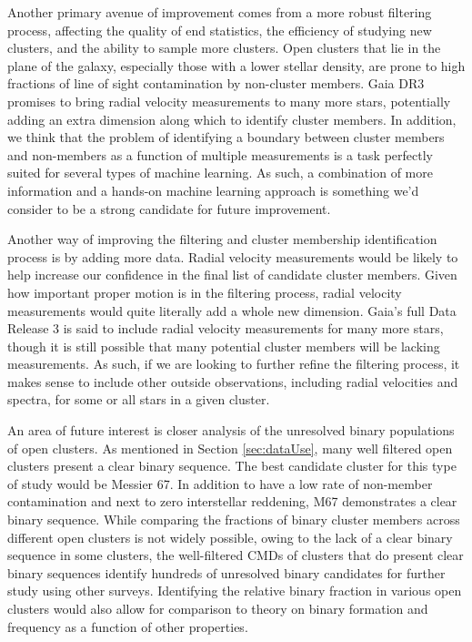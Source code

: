 \documentclass[onecolumn,table,xcdraw,super]{aastex631}
\begin{document}
Another primary avenue of improvement comes from a more robust filtering process, affecting the quality of end statistics, the efficiency of studying new clusters, and the ability to sample more clusters. Open clusters that lie in the plane of the galaxy, especially those with a lower stellar density, are prone to high fractions of line of sight contamination by non-cluster members. Gaia DR3 promises to bring radial velocity measurements to many more stars, potentially adding an extra dimension along which to identify cluster members. In addition, we think that the problem of identifying a boundary between cluster members and non-members as a function of multiple measurements is a task perfectly suited for several types of machine learning. As such, a combination of more information and a hands-on machine learning approach is something we'd consider to be a strong candidate for future improvement.

Another way of improving the filtering and cluster membership identification process is by adding more data. Radial velocity measurements would be likely to help increase our confidence in the final list of candidate cluster members. Given how important proper motion is in the filtering process, radial velocity measurements would quite literally add a whole new dimension. Gaia's full Data Release 3 is said to include radial velocity measurements for many more stars, though it is still possible that many potential cluster members will be lacking measurements. As such, if we are looking to further refine the filtering process, it makes sense to include other outside observations, including radial velocities and spectra, for some or all stars in a given cluster.

An area of future interest is closer analysis of the unresolved binary populations of open clusters. As mentioned in Section \ref{sec:dataUse}, many well filtered open clusters present a clear binary sequence. The best candidate cluster for this type of study would be Messier 67. In addition to have a low rate of non-member contamination and next to zero interstellar reddening, M67 demonstrates a clear binary sequence. While comparing the fractions of binary cluster members across different open clusters is not widely possible, owing to the lack of a clear binary sequence in some clusters, the well-filtered CMDs of clusters that do present clear binary sequences identify hundreds of unresolved binary candidates for further study using other surveys. Identifying the relative binary fraction in various open clusters would also allow for comparison to theory on binary formation and frequency as a function of other properties.
\end{document}
